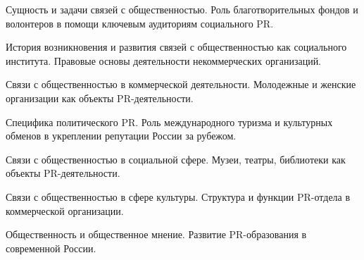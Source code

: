 \documentclass[
	14pt,
	a4paper,
	]
	{scrartcl}
\begin{document}
\shapk
{}
\setcounter{zad}{0}

\vfill
\z Сущность и задачи связей с общественностью.
 \vfill
\z Роль благотворительных фондов и волонтеров в помощи ключевым аудиториям социального PR. \vfill

\vfill

\newpage


\shapk
{}
\setcounter{zad}{0}

\vfill
\z История возникновения и развития связей с общественностью как социального института.
 \vfill
\z Правовые основы деятельности некоммерческих организаций.
 \vfill

\vfill

\newpage


\shapk
{}
\setcounter{zad}{0}

\vfill
\z Связи с общественностью в коммерческой деятельности.
 \vfill
\z Молодежные и женские организации как объекты PR-деятельности.
 \vfill

\vfill

\newpage


\shapk
{}
\setcounter{zad}{0}

\vfill
\z Специфика политического PR.
 \vfill
\z Роль международного туризма и культурных обменов в укреплении репутации России за рубежом.
 \vfill

\vfill

\newpage


\shapk
{}
\setcounter{zad}{0}

\vfill
\z Связи с общественностью в социальной сфере.
 \vfill
\z Музеи, театры, библиотеки как объекты PR-деятельности.
 \vfill

\vfill

\newpage


\shapk
{}
\setcounter{zad}{0}

\vfill
\z Связи с общественностью в сфере культуры.
 \vfill
\z Структура и функции PR-отдела в коммерческой организации.
 \vfill

\vfill

\newpage


\shapk
{}
\setcounter{zad}{0}

\vfill
\z Общественность и общественное мнение.
 \vfill
\z Развитие PR-образования в современной России.
 \vfill

\vfill
\end{document}
